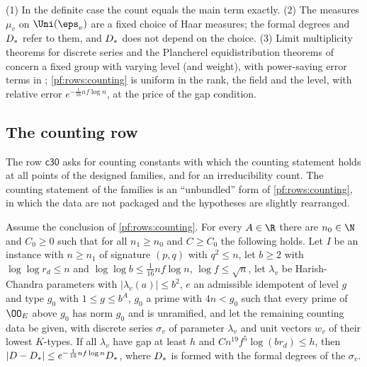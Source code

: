 \begin{remark}\label{pf:rows:countremark}
(1) In the definite case the count equals the main term exactly. (2) The measures $\mu_v$ on $\Uni(\eps_v)$ are a fixed choice
of Haar measures; the formal degrees and $D_*$ refer to them, and $D_*$ does not depend on the choice. (3) Limit multiplicity theorems for discrete series \cite{DeGeorgeWallach1978,Clozel1986,Savin1989} and the Plancherel
equidistribution theorems of \cite{Shin2012,ShinTemplier2016} concern a fixed group with varying level (and weight), with
power-saving error terms in \cite{ShinTemplier2016}; \cref{pf:rows:counting} is uniform in the rank, the field and the
level, with relative error $e^{-\frac1{16}nf\log n}$, at the price of the gap condition.
\end{remark}

\subsection{The counting row}\label{sec:pf:rows:countrow}

The row $\mathsf{c30}$ asks for counting constants with which the counting statement holds at all points of the
designed families, and for an irreducibility count. The counting statement of the families is an ``unbundled'' form of
\cref{pf:rows:counting}, in which the data are not packaged and the hypotheses are slightly rearranged.

\begin{lemma}\label{pf:rows:unbundled}
Assume the conclusion of \cref{pf:rows:counting}. For every $A\in\R$ there are $n_0\in\N$ and $C_0\ge0$ such that for all
$n_1\ge n_0$ and $C\ge C_0$ the following holds. Let $I$ be an instance with $n\ge n_1$ of signature $(p,q)$ with $q^2\le
n$, let $b\ge2$ with $\log\log r_d\le n$ and $\log\log b\le\frac1{16}nf\log n$, $\log f\le\sqrt n$, let
$\lambda_v$ be Harish-Chandra parameters with $|\lambda_v(a)|\le b^2$, $e$ an admissible idempotent of level $g$ and type
$g_0$ with $1\le g\le b^A$, $g_0$ a prime with $4n<g_0$ such that every prime of $\OO_E$ above $g_0$ has norm $g_0$ and
is unramified, and let the remaining counting data be given, with discrete series $\sigma_v$ of parameter $\lambda_v$ and
unit vectors $w_v$ of their lowest $K$-types. If all $\lambda_v$ have gap at least $h$ and $Cn^{19}f^5\log(br_d)\le h$, then
$|D-D_*|\le e^{-\frac1{16}nf\log n}D_*$, where $D_*$ is formed with the formal degrees of the $\sigma_v$.
\end{lemma}

